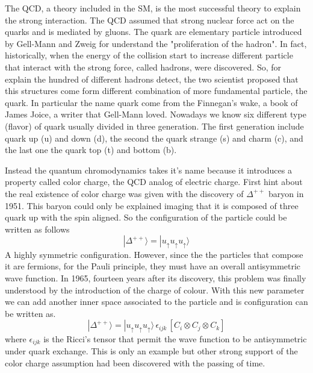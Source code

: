 \documentclass[12pt,a4paper]{book}
\begin{document}
	
	The QCD, a theory included in the SM, is the most successful theory to explain the strong interaction. The QCD assumed that strong nuclear force act on the quarks and is mediated by gluons. The quark are elementary particle introduced by Gell-Mann and Zweig for understand the "proliferation of the hadron". In fact, historically, when the energy of the collision start to increase different particle that interact with the strong force, called hadrons, were discovered. So, for explain the hundred of different hadrons detect, the two scientist proposed that this structures come form different combination of more fundamental particle, the quark. In particular the name quark come from the Finnegan's wake, a book of James Joice, a writer that Gell-Mann loved. Nowadays we know six different type (flavor) of quark usually divided in three generation. The first generation include quark up (u) and down (d), the second the quark strange (s) and charm (c), and the last one the quark top (t) and bottom (b). 
	
	Instead the quantum chromodynamics takes it's name because it introduces a property called color charge, the QCD analog of electric charge. First hint about the real existence of color charge was given with the discovery of $\Delta^{++}$ baryon in 1951. This baryon could only be explained imaging that it is composed of three quark up with the spin aligned. So the configuration of the particle could be written as follows 
	\[
	|\Delta^{++}\rangle = | u_{\uparrow} u_{\uparrow} u_{\uparrow} \rangle
	\]
	A highly symmetric configuration. However, since the the particles that compose it are fermions, for the Pauli principle, they must have an overall antisymmetric wave function. In 1965, fourteen years after its discovery, this problem was finally understood by the introduction of the charge of colour. With this new parameter we can add another inner space associated to the particle and is configuration can be written as.
	\[
	|\Delta^{++}\rangle = | u_{\uparrow} u_{\uparrow} u_{\uparrow} \rangle \, \epsilon_{ijk} \, \left[ C_i \otimes C_j \otimes C_k \right]
	\]
	where $\epsilon_{ijk}$ is the Ricci's tensor that permit the wave function to be antisymmetric under quark exchange. This is only an example but other strong support of the color charge assumption had been discovered with the passing of time.
	
\end{document}
